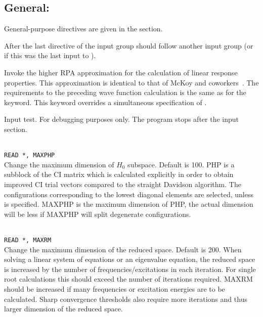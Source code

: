 \subsection{General: }

General-purpose directives are given in the  section.

After the last directive of the  input group
should follow another {} input group
(or  if this was the last input to \dalton).

\begin{description}

\item{}
Invoke the higher RPA approximation for the calculation of linear
response properties.
This approximation is identical to that of McKoy
and coworkers~\cite{jrtsvmjcp58,tsjrvmjcp58}. The requirements to the
preceding wave function 
calculation is the same as for the  keyword.
This keyword overrides a simultaneous specification of .

\item{}
Input test. For debugging purposes only. The program stops after the
input section.

\item{}\\
\verb|READ *, MAXPHP|\\
Change the maximum dimension of $H_0$ subspace.   Default is 100.
PHP is a subblock of the CI matrix which is calculated explicitly
in order to obtain improved CI trial vectors compared to the
straight Davidson algorithm\cite{erdjcp17}.  The configurations
corresponding to 
the lowest diagonal elements are selected, unless  is
specified. MAXPHP is the maximum dimension of PHP, the 
actual dimension will be less if MAXPHP will split degenerate configurations.
 
\item{}\\
\verb|READ *, MAXRM |\\
Change the maximum dimension of the reduced space. Default is 200.
When solving a linear system of equations or an eigenvalue equation,
the reduced space is increased by the number of
frequencies/excitations in each iteration. For single root
calculations this should exceed the number of iterations required.
MAXRM should be increased if many frequencies or excitation energies
are to be calculated.
Sharp convergence thresholds also require
more iterations and thus larger dimension of the reduced space.


\end{description}
